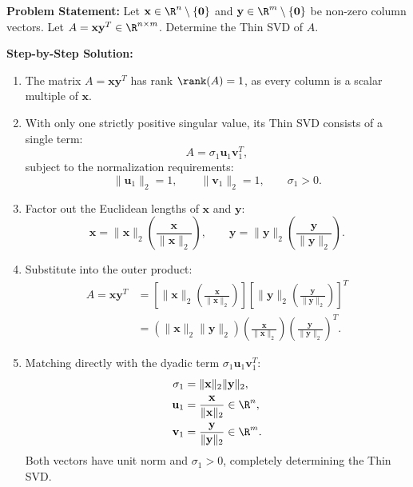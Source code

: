 \begin{example}[Thin SVD of a Rank-1 Outer Product $A = \mathbf{x} \mathbf{y}^T$]
\textbf{Problem Statement:} Let $\mathbf{x} \in \R^n \setminus \{\mathbf{0}\}$ and $\mathbf{y} \in \R^m \setminus \{\mathbf{0}\}$ be non-zero column vectors. Let $A = \mathbf{x} \mathbf{y}^T \in \R^{n \times m}$. Determine the Thin SVD of $A$.

\medskip
\textbf{Step-by-Step Solution:}
\begin{enumerate}
    \item The matrix $A = \mathbf{x} \mathbf{y}^T$ has rank $\rank(A) = 1$, as every column is a scalar multiple of $\mathbf{x}$.
    \item With only one strictly positive singular value, its Thin SVD consists of a single term:
    \begin{equation}
        A = \sigma_1 \mathbf{u}_1 \mathbf{v}_1^T,
    \end{equation}
    subject to the normalization requirements:
    \begin{equation}
        \|\mathbf{u}_1\|_2 = 1, \qquad \|\mathbf{v}_1\|_2 = 1, \qquad \sigma_1 > 0.
    \end{equation}
    \item Factor out the Euclidean lengths of $\mathbf{x}$ and $\mathbf{y}$:
    \begin{equation}
        \mathbf{x} = \|\mathbf{x}\|_2 \left( \frac{\mathbf{x}}{\|\mathbf{x}\|_2} \right), \qquad \mathbf{y} = \|\mathbf{y}\|_2 \left( \frac{\mathbf{y}}{\|\mathbf{y}\|_2} \right).
    \end{equation}
    \item Substitute into the outer product:
    \begin{align}
        A = \mathbf{x} \mathbf{y}^T &= \left[ \|\mathbf{x}\|_2 \left( \frac{\mathbf{x}}{\|\mathbf{x}\|_2} \right) \right] \left[ \|\mathbf{y}\|_2 \left( \frac{\mathbf{y}}{\|\mathbf{y}\|_2} \right) \right]^T \nonumber \\
        &= \left( \|\mathbf{x}\|_2 \|\mathbf{y}\|_2 \right) \left( \frac{\mathbf{x}}{\|\mathbf{x}\|_2} \right) \left( \frac{\mathbf{y}}{\|\mathbf{y}\|_2} \right)^T.
    \end{align}
    \item Matching directly with the dyadic term $\sigma_1 \mathbf{u}_1 \mathbf{v}_1^T$:
    \begin{align}
        \sigma_1 &= \|\mathbf{x}\|_2 \|\mathbf{y}\|_2, \\
        \mathbf{u}_1 &= \frac{\mathbf{x}}{\|\mathbf{x}\|_2} \in \R^n, \\
        \mathbf{v}_1 &= \frac{\mathbf{y}}{\|\mathbf{y}\|_2} \in \R^m.
    \end{align}
    Both vectors have unit norm and $\sigma_1 > 0$, completely determining the Thin SVD.
\end{enumerate}
\end{example}

